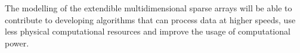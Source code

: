 The modelling of the extendible multidimensional sparse arrays will be able to contribute to developing algorithms that can process data at higher speeds, use less physical computational resources and improve the usage of computational power.

